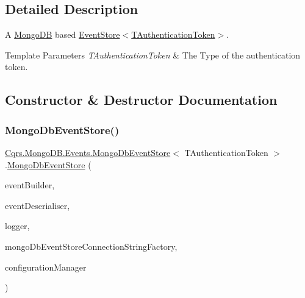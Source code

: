 \subsection{Detailed Description}
A \hyperlink{namespaceCqrs_1_1MongoDB}{Mongo\+DB} based \hyperlink{classCqrs_1_1Events_1_1EventStore_a6346cb2aea4c5b4e740dc6cfb15abab8_a6346cb2aea4c5b4e740dc6cfb15abab8}{Event\+Store$<$\+T\+Authentication\+Token$>$}. 


\begin{DoxyTemplParams}{Template Parameters}
{\em T\+Authentication\+Token} & The Type of the authentication token.\\
\hline
\end{DoxyTemplParams}


\subsection{Constructor \& Destructor Documentation}
\mbox{\label{classCqrs_1_1MongoDB_1_1Events_1_1MongoDbEventStore_a37e57e6f1e4e545630c1c98a5aab46a3_a37e57e6f1e4e545630c1c98a5aab46a3}} 
\subsubsection{\texorpdfstring{Mongo\+Db\+Event\+Store()}{MongoDbEventStore()}}
{\footnotesize\ttfamily \hyperlink{classCqrs_1_1MongoDB_1_1Events_1_1MongoDbEventStore}{Cqrs.\+Mongo\+D\+B.\+Events.\+Mongo\+Db\+Event\+Store}$<$ T\+Authentication\+Token $>$.\hyperlink{classCqrs_1_1MongoDB_1_1Events_1_1MongoDbEventStore}{Mongo\+Db\+Event\+Store} (\begin{DoxyParamCaption}\item[{\hyperlink{interfaceCqrs_1_1Events_1_1IEventBuilder}{I\+Event\+Builder}$<$ T\+Authentication\+Token $>$}]{event\+Builder,  }\item[{\hyperlink{interfaceCqrs_1_1Events_1_1IEventDeserialiser}{I\+Event\+Deserialiser}$<$ T\+Authentication\+Token $>$}]{event\+Deserialiser,  }\item[{I\+Logger}]{logger,  }\item[{\hyperlink{interfaceCqrs_1_1MongoDB_1_1Events_1_1IMongoDbEventStoreConnectionStringFactory}{I\+Mongo\+Db\+Event\+Store\+Connection\+String\+Factory}}]{mongo\+Db\+Event\+Store\+Connection\+String\+Factory,  }\item[{\hyperlink{interfaceCqrs_1_1Configuration_1_1IConfigurationManager}{I\+Configuration\+Manager}}]{configuration\+Manager }\end{DoxyParamCaption})}




